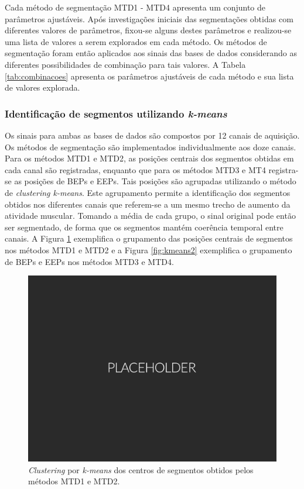 Cada método de segmentação MTD1 - MTD4 apresenta um conjunto de parâmetros ajustáveis. Após investigações iniciais das segmentações obtidas com diferentes valores de parâmetros, fixou-se alguns destes parâmetros e realizou-se uma lista de valores a serem explorados em cada método. Os métodos de segmentação foram então aplicados aos sinais das bases de dados considerando as diferentes possibilidades de combinação para tais valores. A Tabela \ref{tab:combinacoes} apresenta os parâmetros ajustáveis de cada método e sua lista de valores explorada.



\subsubsection{Identificação de segmentos utilizando \emph{k-means}}

Os sinais para ambas as bases de dados são compostos por 12 canais de aquisição. Os métodos de segmentação são implementados individualmente aos doze canais. Para os métodos MTD1 e MTD2, as posições centrais dos segmentos obtidas em cada canal são registradas, enquanto que para os métodos MTD3 e MT4 registra-se as posições de BEPs e EEPs. Tais posições são agrupadas utilizando o método de \emph{clustering k-means}. Este agrupamento permite a identificação dos segmentos obtidos nos diferentes canais que referem-se a um mesmo trecho de aumento da atividade muscular. Tomando a média de cada grupo, o sinal original pode então ser segmentado, de forma que os segmentos mantém coerência temporal entre canais. A Figura \ref{fig:kmeans1} exemplifica o grupamento das posições centrais de segmentos nos métodos MTD1 e MTD2 e a Figura \ref{fig:kmeans2} exemplifica o grupamento de BEPs e EEPs nos métodos MTD3 e MTD4.

\begin{figure}[htb]
	\caption{\label{fig:kmeans1}\emph{Clustering} por \emph{k-means} dos centros de segmentos obtidos pelos métodos MTD1 e MTD2.}
	\begin{center}
	    \includegraphics[width=0.75\linewidth]{./img/placeholder.png}
	\end{center}
\end{figure}

